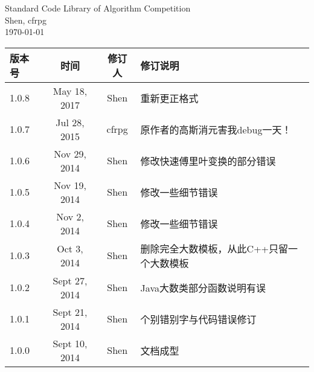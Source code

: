 \documentclass[12pt,a4paper,openany,oneside]{book}
\title{\strtitle}
\author{\strauthor}
\date{\today}
\newcommand\strtitle{Standard Code Library of Algorithm Competition}
\newcommand\strauthor{Shen, cfrpg}
\begin{document}
\begin{titlepage}
\vspace*{\fill}
\begin{center}
    {\Huge \strtitle} \\
    \vspace{1em}
    {\Large \strauthor} \\
    \vspace{1em}
    {\Large \today} \\
\end{center}
\vspace{1em}
\begin{longtable}{|l|c|c|l|}
    \hline
    版本号 & 时间 & 修订人 & 修订说明 \\
    \hline
    1.0.8 & May 18, 2017 & Shen & 重新更正格式 \\
    \hline
    1.0.7 & Jul 28, 2015 & cfrpg & 原作者的高斯消元害我debug一天！ \\
    \hline
    1.0.6 & Nov 29, 2014 & Shen & 修改快速傅里叶变换的部分错误 \\
    \hline
    1.0.5 & Nov 19, 2014 & Shen & 修改一些细节错误 \\
    \hline
    1.0.4 & Nov 2, 2014 & Shen & 修改一些细节错误 \\
    \hline
    1.0.3 & Oct 3, 2014 & Shen & 删除完全大数模板，从此C++只留一个大数模板 \\
    \hline
    1.0.2 & Sept 27, 2014 & Shen & Java大数类部分函数说明有误 \\
    \hline
    1.0.1 & Sept 21, 2014 & Shen & 个别错别字与代码错误修订 \\
    \hline
    1.0.0 & Sept 10, 2014 & Shen & 文档成型 \\
    \hline
\end{longtable}
\end{titlepage}
\thispagestyle{fancy}
\clearpage
{}
{}
\tableofcontents
\clearpage









\end{document}
